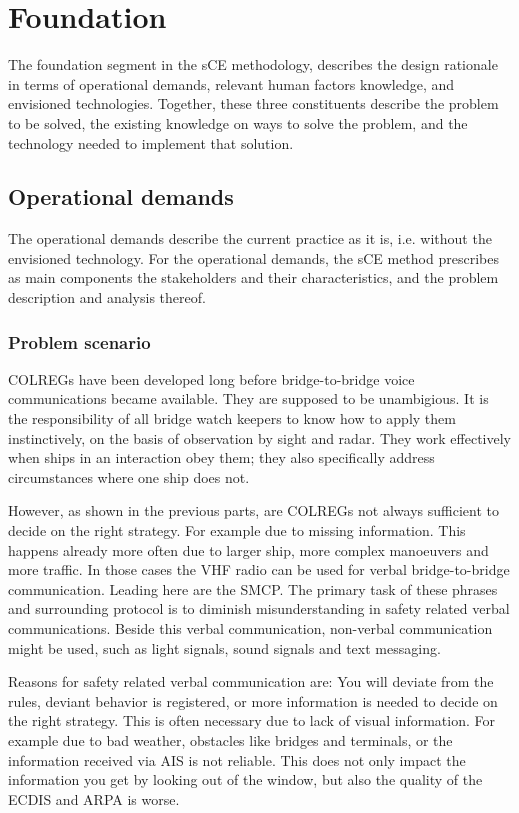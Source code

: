 \chapter{Foundation}
The foundation segment in the \acf{sCE} methodology, describes the design rationale in terms of operational demands, relevant human factors knowledge, and envisioned technologies. Together, these three constituents describe the problem to be solved, the existing knowledge on ways to solve the problem, and the technology needed to implement that solution.

\section{Operational demands}
The operational demands describe the current practice as it is, i.e. without the envisioned technology. For the operational demands, the sCE method prescribes as main components the stakeholders and their characteristics, and the problem description and analysis thereof.

\subsection{Problem scenario}
\acf{COLREGs} have been developed long before bridge-to-bridge voice communications became available. They are supposed to be unambigious. It is the responsibility of all bridge watch keepers to know how to apply them instinctively, on the basis of observation by sight and radar. They work effectively when ships in an interaction obey them; they also specifically address circumstances where one ship does not.

However, as shown in the previous parts, are \ac{COLREGs} not always sufficient to decide on the right strategy. For example due to missing information. This happens already more often due to larger ship, more complex manoeuvers and more traffic. In those cases the \ac{VHF} radio can be used for verbal bridge-to-bridge communication. Leading here are the \acf{SMCP}. The primary task of these phrases and surrounding protocol is to diminish misunderstanding in safety related verbal communications. Beside this verbal communication, non-verbal communication might be used, such as light signals, sound signals and text messaging.

Reasons for safety related verbal communication are: You will deviate from the rules, deviant behavior is registered, or more information is needed to decide on the right strategy. This is often necessary due to lack of visual information. For example due to bad weather, obstacles like bridges and terminals, or the information received via \ac{AIS} is not reliable. This does not only impact the information you get by looking out of the window, but also the quality of the \acf{ECDIS} and \acf{ARPA} is worse.

